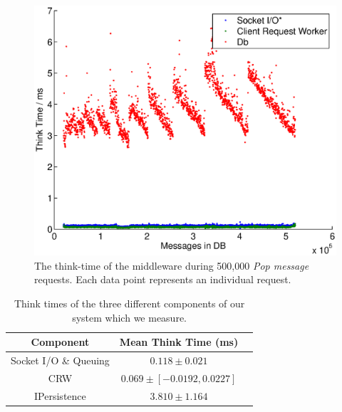 \documentclass{article}
\begin{document}
                \begin{figure}[H]
                    \centering
                    \centerline{\includegraphics[scale=0.50]{thinktime_500k_pop}}
                    \caption{The think-time of the middleware during 500,000 \textit{Pop message} requests. Each data point represents an individual request.}
                    \label{fig:thinktime_500k_pop}
                \end{figure}

                \begin{table}[H]
                    \centering
                    \begin{tabular}{|c|c|c|}
                        \hline 
                        \textbf{Component} & \textbf{Mean Think Time} (ms)\\ 
                        \hline 
                        Socket I/O \& Queuing & $0.118\pm0.021$ \\ 
                        \hline 
                        CRW & $0.069\pm [-0.0192 , 0.0227]$ \\ 
                        \hline 
                        IPersistence & $3.810\pm1.164$ \\ 
                        \hline 
                    \end{tabular}
                    \caption{Think times of the three different components of our system which we measure.}
                    \label{table:think_time_send_message}
                \end{table}
                
\end{document}
